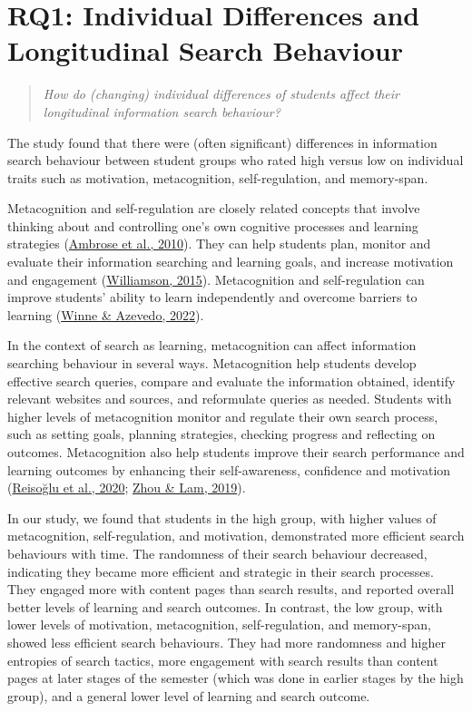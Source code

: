 \documentclass[letterpaper, nobind]{templates/ociamthesis}
\begin{document}
\hypertarget{rq1-individual-differences-and-longitudinal-search-behaviour}{%
\section{RQ1: Individual Differences and Longitudinal Search Behaviour}\label{rq1-individual-differences-and-longitudinal-search-behaviour}}

\begin{quote}
\emph{How do (changing) individual differences of students affect their longitudinal information search behaviour?}
\end{quote}

The study found that there were (often significant) differences in information search behaviour between student groups who rated high versus low on individual traits such as motivation, metacognition, self-regulation, and memory-span.

Metacognition and self-regulation are closely related concepts that involve thinking about and controlling one's own cognitive processes and learning strategies (\protect\hyperlink{ref-ambrose2010howa}{Ambrose et al., 2010}).
They can help students plan, monitor and evaluate their information searching and learning goals, and increase motivation and engagement (\protect\hyperlink{ref-williamson2015selfregulated}{Williamson, 2015}).
Metacognition and self-regulation can improve students' ability to learn independently and overcome barriers to learning (\protect\hyperlink{ref-winne2022metacognition}{Winne \& Azevedo, 2022}).

In the context of search as learning, metacognition can affect information searching behaviour in several ways.
Metacognition help students develop effective search queries, compare and evaluate the information obtained, identify relevant websites and sources, and reformulate queries as needed.
Students with higher levels of metacognition monitor and regulate their own search process, such as setting goals, planning strategies, checking progress and reflecting on outcomes.
Metacognition also help students improve their search performance and learning outcomes by enhancing their self-awareness, confidence and motivation (\protect\hyperlink{ref-reisouglu2020analysis}{Reisoğlu et al., 2020}; \protect\hyperlink{ref-zhou2019metacognitive}{Zhou \& Lam, 2019}).

In our study, we found that students in the high group, with higher values of metacognition, self-regulation, and motivation, demonstrated more efficient search behaviours with time.
The randomness of their search behaviour decreased, indicating they became more efficient and strategic in their search processes.
They engaged more with content pages than search results, and reported overall better levels of learning and search outcomes.
In contrast, the low group, with lower levels of motivation, metacognition, self-regulation, and memory-span, showed less efficient search behaviours.
They had more randomness and higher entropies of search tactics, more engagement with search results than content pages at later stages of the semester (which was done in earlier stages by the high group), and a general lower level of learning and search outcome.
\end{document}

